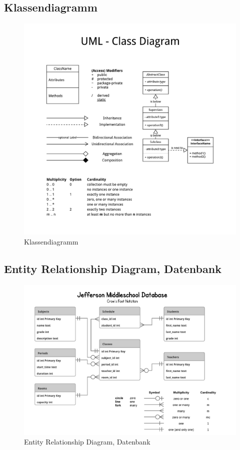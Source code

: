 \documentclass[11pt, a4paper]{article}
\begin{document}
    \subsection{Klassendiagramm}
      \begin{figure}[h!]
        \includegraphics[width=\linewidth]{fig/UML_Classdiagram.pdf}
        \caption{Klassendiagramm}
        \label{fig:classdiagram}
      \end{figure}
      \newpage

    \subsection{Entity Relationship Diagram, Datenbank}
      \begin{figure}[h!]
        \includegraphics[width=\linewidth]{fig/ERD_JeffersonMiddleSchool.pdf}
        \caption{Entity Relationship Diagram, Datenbank}
        \label{fig:classdiagram}
      \end{figure}
      \newpage
\end{document}
